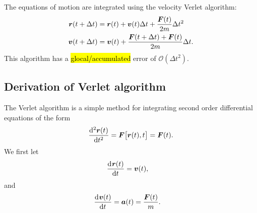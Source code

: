 
The equations of motion are integrated using the velocity Verlet algorithm:
\begin{align*}
    \boldsymbol{r}(t + \Delta t) &= \boldsymbol{r}(t) + \boldsymbol{v}(t)\Delta t + \frac{\boldsymbol{F}(t)}{2m}\Delta t^2 \\
    \boldsymbol{v}(t + \Delta t) &= \boldsymbol{v}(t) + \frac{\boldsymbol{F}(t + \Delta t) + \boldsymbol{F}(t)}{2m}\Delta t.
\end{align*}
This algorithm has a \hl{glocal/accumulated} error of $\mathcal{O}(\Delta t^2)$.

\subsection{Derivation of Verlet algorithm}
The Verlet algorithm\cite{verlet1967computer} is a simple method for integrating second order differential equations of the form 
\begin{align*}
    \dod[2]{\rvec(t)}{t} = \Fvec\big[\rvec(t), t\big] = \Fvec(t).
\end{align*}
We first let
\begin{align*}
    \dod{\rvec(t)}{t} &= \vvec(t),
\end{align*}
and
\begin{align*}
    \dod{\vvec(t)}{t} &= \avec(t) = \frac{\Fvec(t)}{m}.
\end{align*}

